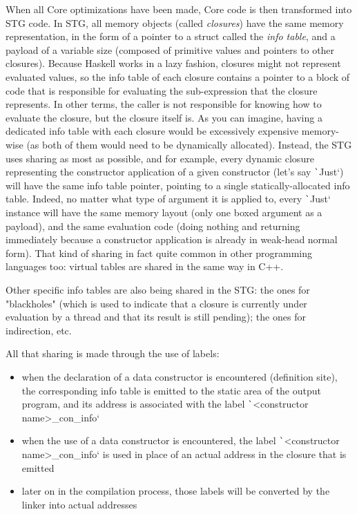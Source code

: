 \documentclass[english]{jflart}
\begin{document}
When all Core optimizations have been made, Core code is then transformed into STG code. In STG, all memory objects (called \emph{closures}) have the same memory representation, in the form of a pointer to a struct called the \emph{info table}, and a payload of a variable size (composed of primitive values and pointers to other closures). Because Haskell works in a lazy fashion, closures might not represent evaluated values, so the info table of each closure contains a pointer to a block of code that is responsible for evaluating the sub-expression that the closure represents. In other terms, the caller is not responsible for knowing how to evaluate the closure, but the closure itself is.
As you can imagine, having a dedicated info table with each closure would be excessively expensive memory-wise (as both of them would need to be dynamically allocated). Instead, the STG uses sharing as most as possible, and for example, every dynamic closure representing the constructor application of a given constructor (let's say \texttt`Just`) will have the same info table pointer, pointing to a single statically-allocated info table. Indeed, no matter what type of argument it is applied to, every \texttt`Just` instance will have the same memory layout (only one boxed argument as a payload), and the same evaluation code (doing nothing and returning immediately because a constructor application is already in weak-head normal form). That kind of sharing in fact quite common in other programming languages too: virtual tables are shared in the same way in C++.

Other specific info tables are also being shared in the STG: the ones for "blackholes" (which is used to indicate that a closure is currently under evaluation by a thread and that its result is still pending); the ones for indirection, etc.

All that sharing is made through the use of labels:

\begin{itemize}

\item when the declaration of a data constructor is encountered (definition site), the corresponding info table is emitted to the static area of the output program, and its address is associated with the label \texttt`<constructor name>_con_info`
\item when the use of a data constructor is encountered, the label \texttt`<constructor name>_con_info` is used in place of an actual address in the closure that is emitted
\item later on in the compilation process, those labels will be converted by the linker into actual addresses

\end{itemize}
\end{document}
